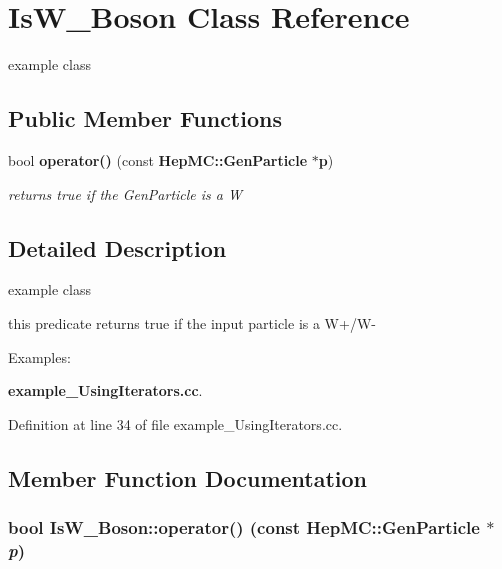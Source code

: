 \section{Is\-W\_\-Boson Class Reference}
\label{classIsW__Boson}
example class  


\subsection*{Public Member Functions}
\begin{CompactItemize}
\item 
bool {\bf operator()} (const {\bf Hep\-MC::Gen\-Particle} $\ast${\bf p})
\begin{CompactList}\small\item\em returns true if the Gen\-Particle is a W \item\end{CompactList}\end{CompactItemize}


\subsection{Detailed Description}
example class 

this predicate returns true if the input particle is a W+/W- \begin{Desc}
\item[Examples: ]\par


{\bf example\_\-Using\-Iterators.cc}.\end{Desc}




Definition at line 34 of file example\_\-Using\-Iterators.cc.

\subsection{Member Function Documentation}
\subsubsection{\setlength{\rightskip}{0pt plus 5cm}bool Is\-W\_\-Boson::operator() (const {\bf Hep\-MC::Gen\-Particle} $\ast$ {\em p})\hspace{0.3cm}{\tt  [inline]}}\label{classIsW__Boson_206d7b0078c631b69c2cbc4c81846e55}


